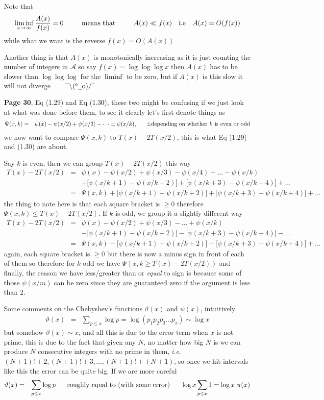 \documentclass[aps,preprint,preprintnumbers,nofootinbib,showpacs,prd]{revtex4-1}
\newcommand{\ie}{{\it i.e.} }
\newcommand{\nbea}{\begin{eqnarray*}}
\newcommand{\neea}{\end{eqnarray*}}
\newcommand{\dunno}{$ {}^{\mbox {--}}\backslash(^{\rm o}{}\underline{\hspace{0.2cm}}{\rm o})/^{\mbox {--}}$}
\begin{document}
Note that
%
\nbea
\liminf_{x\to\infty} \frac{A(x)}{f(x)} = 0 ~~~~~~~~ {\rm means~that} ~~~~~~~~ A(x) \ll f(x) ~~~{\rm i.e} ~~~ A(x) = O(f(x))
\neea
%
while what we want is the reverse $f(x) = O(A(x))$

Another thing is that $A(x)$ is monotonically increasing as it is just counting the number of integers in $\mathcal{A}$ so say $f(x) = \log\log\log x$ then $A(x)$ has to be slower than $\log\log\log$ for the $\liminf$ to be zero, but if $A(x)$ is this slow it will not diverge ~~~ \dunno

{\bf Page 30}, Eq (1.29) and Eq (1.30), these two might be confusing if we just look at what was done before them, to see it clearly let's first denote things as
%
\nbea
\Psi(x,k) & = & \psi(x) - \psi(x/2) + \psi(x/3) - \dots \pm \psi(x/k), ~~~~~ \pm {\rm depending~on~whether~} k ~{\rm is~even~or~odd}
\neea
%
we now want to compare $\Psi(x,k)$ to $T(x) - 2T(x/2)$, this is what Eq (1.29) and (1.30) are about.

Say $k$ is even, then we can group $T(x) - 2T(x/2)$ this way
%
\nbea
T(x) - 2T(x/2) & = & \psi(x) - \psi(x/2) + \psi(x/3) - \psi(x/4) + \dots - \psi(x/k) \\
&& + \lbrack\psi(x/k+1) - \psi(x/k+2)\rbrack + \lbrack\psi(x/k+3) - \psi(x/k+4)\rbrack + \dots \\
& = & \Psi(x,k) + \lbrack\psi(x/k+1) - \psi(x/k+2)\rbrack + \lbrack\psi(x/k+3) - \psi(x/k+4)\rbrack + \dots
\neea
%
the thing to note here is that each square bracket is $\ge 0$ therefore $\Psi(x,k) \le T(x) - 2T(x/2)$. If $k$ is odd, we group it a slightly different way
%
\nbea
T(x) - 2T(x/2) & = & \psi(x) - \psi(x/2) + \psi(x/3) - \dots + \psi(x/k) \\
&& - \lbrack\psi(x/k+1) - \psi(x/k+2)\rbrack - \lbrack\psi(x/k+3) - \psi(x/k+4)\rbrack - \dots \\
& = & \Psi(x,k) - \lbrack\psi(x/k+1) - \psi(x/k+2)\rbrack - \lbrack\psi(x/k+3) - \psi(x/k+4)\rbrack + \dots
\neea
%
again, each square bracket is $\ge 0$ but there is now a minus sign in front of each of them so therefore for $k$ odd we have $\Psi(x,k \ge T(x) - 2T(x/2))$ and finally, the reason we have less/greater than or {\it equal} to sign is because some of those $\psi(x/m)$ can be zero since they are guaranteed zero if the argument is less than 2.



Some comments on the Chebyshev's functions $\vartheta(x)$ and $\psi(x)$, intuitively
%
\nbea
\vartheta(x) & = & \sum_{p \le x} \log p = \log(p_1 p_2 p_3 \dots p_x) \sim \log x
\neea
%
but somehow $\vartheta(x) \sim x$, and all this is due to the error term when $x$ is not prime, this is due to the fact that given any $N$, no matter how big $N$ is we can produce $N$ consecutive integers with no prime in them, \ie $(N+1)! + 2, (N+1)! + 3, \dots,  (N+1)! + (N+1)$, so once we hit intervals like this the error can be quite big. If we are more careful
%
\nbea
\vartheta(x) & = & \sum_{p \le x} \log p ~~~~~{\rm roughly~equal~to~(with~some~error)}~~~~~ \log x \sum_{p \le x} 1 = \log x ~ \pi (x)
\neea
%
\end{document}
